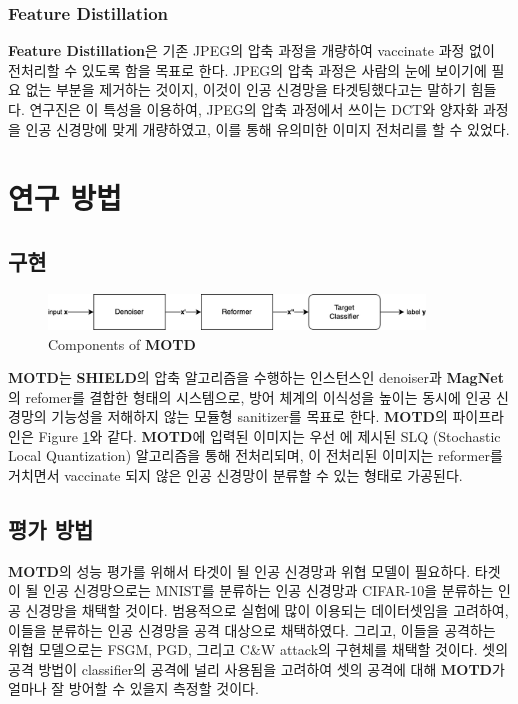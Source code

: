 \documentclass{article}
\begin{document}
\subsubsection{Feature Distillation}
\textbf{Feature Distillation}은 기존 JPEG의 압축 과정을 개량하여 vaccinate 과정 없이 전처리할 수 있도록 함을 목표로 한다.\cite{liu2019feature} JPEG의 압축 과정은 사람의 눈에 보이기에 필요 없는 부분을 제거하는 것이지, 이것이 인공 신경망을 타겟팅했다고는 말하기 힘들다. 연구진은 이 특성을 이용하여, JPEG의 압축 과정에서 쓰이는 DCT와 양자화 과정을 인공 신경망에 맞게 개량하였고, 이를 통해 유의미한 이미지 전처리를 할 수 있었다.

\section{연구 방법}

\subsection{구현}

\begin{figure}[h]
    \centering
    \includegraphics[width=10cm]{images/motd-diagram.png}
    \caption{Components of \textbf{MOTD}}
    \label{fig:motd-diagram}
\end{figure}

\textbf{MOTD}는 \textbf{SHIELD}의 압축 알고리즘을 수행하는 인스턴스인 denoiser과 \textbf{MagNet}의 refomer를 결합한 형태의 시스템으로, 방어 체계의 이식성을 높이는 동시에 인공 신경망의 기능성을 저해하지 않는 모듈형 sanitizer를 목표로 한다. \textbf{MOTD}의 파이프라인은 Figure \ref{fig:motd-diagram}와 같다. \textbf{MOTD}에 입력된 이미지는 우선 \cite{das2018shield}에 제시된 SLQ (Stochastic Local Quantization) 알고리즘을 통해 전처리되며, 이 전처리된 이미지는 reformer를 거치면서 vaccinate 되지 않은 인공 신경망이 분류할 수 있는 형태로 가공된다.

\subsection{평가 방법}

\textbf{MOTD}의 성능 평가를 위해서 타겟이 될 인공 신경망과 위협 모델이 필요하다. 타겟이 될 인공 신경망으로는 MNIST를 분류하는 인공 신경망과 CIFAR-10을 분류하는 인공 신경망을 채택할 것이다. 범용적으로 실험에 많이 이용되는 데이터셋임을 고려하여, 이들을 분류하는 인공 신경망을 공격 대상으로 채택하였다. 그리고, 이들을 공격하는 위협 모델으로는 FSGM, PGD, 그리고 C\&W attack의 구현체를 채택할 것이다. 셋의 공격 방법이 classifier의 공격에 널리 사용됨을 고려하여 셋의 공격에 대해 \textbf{MOTD}가 얼마나 잘 방어할 수 있을지 측정할 것이다.
\end{document}
